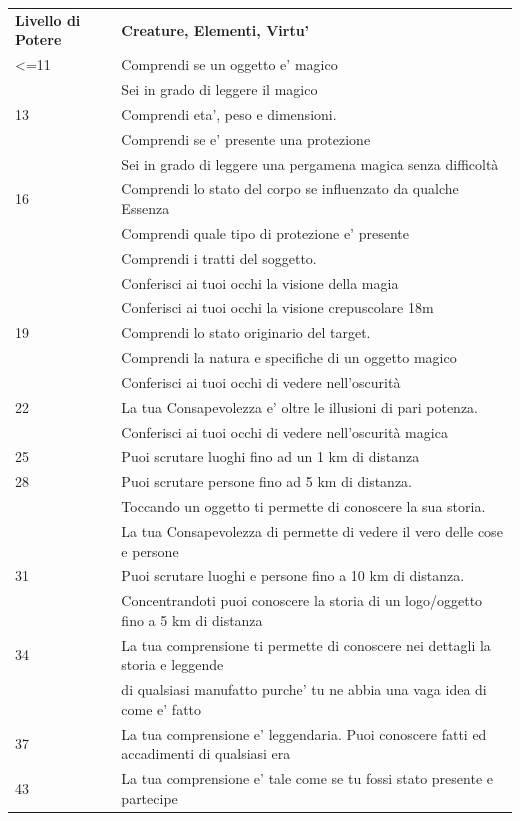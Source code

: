 \documentclass[a4paper,10 pt,twoside,openany]{book}
\begin{document}
\begin{tabularx}{0.95\textwidth}{lX}
	\toprule
	\textbf{Livello di Potere} & \textbf{Creature, Elementi, Virtu'}\\
	<=11   & Comprendi se un oggetto e’ magico  \\
	& Sei in grado di leggere il magico  \\
	13& Comprendi eta’, peso e dimensioni. \\
	& Comprendi se e’ presente una protezione \\
	& Sei in grado di leggere una pergamena magica senza difficoltà   \\
	16& Comprendi lo stato del corpo se influenzato da qualche Essenza   \\
	& Comprendi quale tipo di protezione e’ presente    \\
	& Comprendi i tratti del soggetto.   \\
	& Conferisci ai tuoi occhi la visione della magia   \\
	& Conferisci ai tuoi occhi la visione crepuscolare 18m   \\
	19& Comprendi lo stato originario del target.    \\
	& Comprendi la natura e specifiche di un oggetto magico  \\
	& Conferisci ai tuoi occhi di vedere nell’oscurità \\
	22& La tua Consapevolezza e’ oltre le illusioni di pari potenza.\\
	& Conferisci ai tuoi occhi di vedere nell’oscurità magica    \\
	25& Puoi scrutare luoghi fino ad un 1 km di distanza  \\
	28& Puoi scrutare persone fino ad 5 km di distanza.   \\
	& Toccando un oggetto ti permette di conoscere la sua storia. \\
	& La tua Consapevolezza di permette di vedere il vero delle cose e persone   \\
	31& Puoi scrutare luoghi e persone fino a 10 km di distanza.    \\
	& Concentrandoti puoi conoscere la storia di un logo/oggetto fino a 5 km di distanza   \\
	34& La tua comprensione ti permette di conoscere nei dettagli la storia e
	leggende \\
	& di qualsiasi manufatto purche’ tu ne abbia una vaga idea di come e’ fatto  \\
	37& La tua comprensione e’ leggendaria. Puoi conoscere fatti ed accadimenti  di qualsiasi era \\
	43& La tua comprensione e’ tale come se tu fossi stato presente e partecipe    \\
\end{tabularx}
\end{document}
